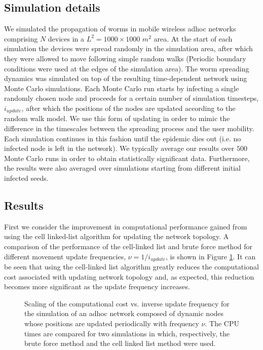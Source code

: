 \documentclass{elsart}
\begin{document}
\subsection{Simulation details}
We simulated the propagation of worms in mobile 
wireless adhoc 
networks comprising $N$  devices in a $L^2=1000\times 1000$ $m^2$ 
area. At the start of each simulation the devices were spread randomly 
in the simulation area, after which they 
were allowed to move following simple random walks (Periodic 
boundary conditions were used at the edges of the simulation area).
The worm spreading dynamics was 
simulated on top of the resulting time-dependent 
network using  Monte Carlo simulations. Each Monte Carlo run starts
by infecting a single randomly chosen node and proceeds for a certain 
number of simulation timesteps, $i_{update}$, 
after which  the positions of the nodes are updated 
according to the random walk model. We use this form of updating in 
order to mimic the difference in the timescales between the spreading process 
and the user mobility. Each simulation continues  in this fashion 
until the epidemic dies out (i.e. no infected node is left in the network).
We typically average our results over $500$ Monte Carlo runs in order
to obtain statistically significant data. 
Furthermore, the results were also averaged over simulations
starting from different initial infected seeds. 

\subsection{Results}
First we consider the improvement in computational performance 
gained from using the cell linked-list algorithm for updating the 
network topology. 
A comparison of the performance of the cell-linked list and brute force
method for different movement 
update frequencies, $\nu=1/i_{update}$, is shown in Figure \ref{f:move}.
It can be seen that using the cell-linked list algorithm greatly 
reduces the computational cost associated with updating network topology and, 
as expected, this reduction becomes more significant as the update frequency 
increases. 

\begin{figure}
\centering
{}
\caption{Scaling of the computational cost vs. inverse update frequency for 
the simulation of an adhoc network composed of dynamic 
nodes whose positions are updated periodically with frequency $\nu$.
The CPU times are compared for two simulations in which, respectively, 
the brute force method and the cell linked list method were used.}
\label{f:move}
\end{figure}
\end{document}
